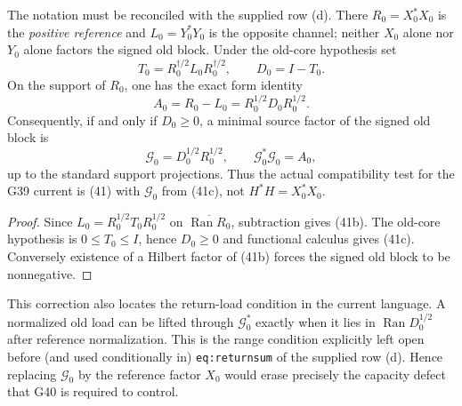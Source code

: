 \documentclass[11pt]{article}
\newcommand{\Ran}{\operatorname{Ran}}
\begin{document}
The notation must be reconciled with the supplied row (d).  There
$R_0=X_0^*X_0$ is the \emph{positive reference} and
$L_0=Y_0^*Y_0$ is the opposite channel; neither $X_0$ alone nor $Y_0$ alone
factors the signed old block.  Under the old-core hypothesis set
\begin{equation}
 T_0=R_0^{\dagger/2}L_0R_0^{\dagger/2},
 \qquad D_0=I-T_0.                                    \tag{41a}
\end{equation}
On the support of $R_0$, one has the exact form identity
\begin{equation}
 A_0=R_0-L_0
 =R_0^{1/2}D_0R_0^{1/2}.                              \tag{41b}
\end{equation}
Consequently, if and only if $D_0\ge0$, a minimal source factor of the signed
old block is
\begin{equation}
 \mathcal G_0=D_0^{1/2}R_0^{1/2},
 \qquad \mathcal G_0^*\mathcal G_0=A_0,               \tag{41c}
\end{equation}
up to the standard support projections.  Thus the actual compatibility test
for the G39 current is (41) with $\mathcal G_0$ from (41c), not
$H^*H=X_0^*X_0$.

\begin{proof}
Since $L_0=R_0^{1/2}T_0R_0^{1/2}$ on
$\overline{\Ran R_0}$, subtraction gives (41b).  The old-core hypothesis is
$0\le T_0\le I$, hence $D_0\ge0$ and functional calculus gives (41c).
Conversely existence of a Hilbert factor of (41b) forces the signed old block
to be nonnegative.
\end{proof}

This correction also locates the return-load condition in the current
language.  A normalized old load can be lifted through $\mathcal G_0^*$
exactly when it lies in $\Ran D_0^{1/2}$ after reference normalization.  This
is the range condition explicitly left open before (and used conditionally
in) \texttt{eq:returnsum} of the supplied row (d).  Hence replacing
$\mathcal G_0$ by the reference factor $X_0$ would erase precisely the
capacity defect that G40 is required to control.
\end{document}
